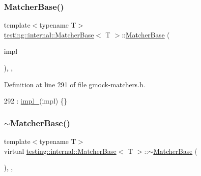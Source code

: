 \subsubsection{\texorpdfstring{Matcher\+Base()}{MatcherBase()}\hspace{0.1cm}{\footnotesize\ttfamily [2/2]}}
{\footnotesize\ttfamily template$<$typename T$>$ \\
\hyperlink{classtesting_1_1internal_1_1MatcherBase}{testing\+::internal\+::\+Matcher\+Base}$<$ T $>$\+::\hyperlink{classtesting_1_1internal_1_1MatcherBase}{Matcher\+Base} (\begin{DoxyParamCaption}\item[{const \hyperlink{classtesting_1_1MatcherInterface}{Matcher\+Interface}$<$ T $>$ $\ast$}]{impl }\end{DoxyParamCaption})\hspace{0.3cm}{\ttfamily [inline]}, {\ttfamily [explicit]}, {\ttfamily [protected]}}



Definition at line 291 of file gmock-\/matchers.\+h.


\begin{DoxyCode}
292       : \hyperlink{classtesting_1_1internal_1_1MatcherBase_ab4bf73686e35b5f033e7db82498644aa}{impl\_}(impl) \{\}
\end{DoxyCode}
\mbox{\label{classtesting_1_1internal_1_1MatcherBase_a6f8cbfaa5fa9205f297d84fb1741d9c3}} 
\subsubsection{\texorpdfstring{$\sim$\+Matcher\+Base()}{~MatcherBase()}}
{\footnotesize\ttfamily template$<$typename T$>$ \\
virtual \hyperlink{classtesting_1_1internal_1_1MatcherBase}{testing\+::internal\+::\+Matcher\+Base}$<$ T $>$\+::$\sim$\hyperlink{classtesting_1_1internal_1_1MatcherBase}{Matcher\+Base} (\begin{DoxyParamCaption}{ }\end{DoxyParamCaption})\hspace{0.3cm}{\ttfamily [inline]}, {\ttfamily [protected]}, {\ttfamily [virtual]}}




